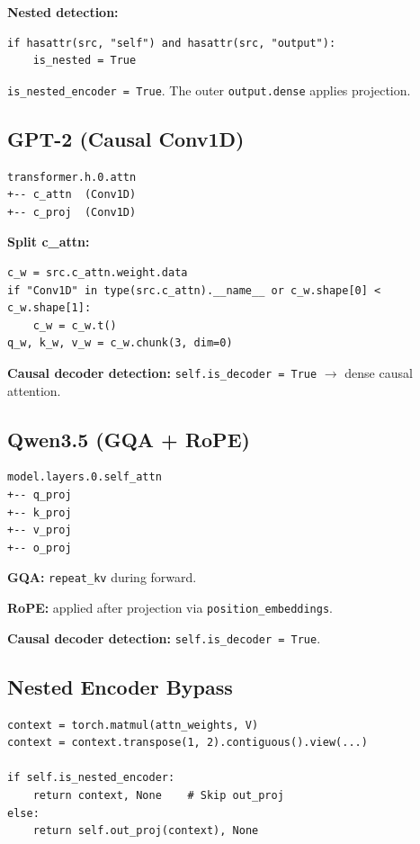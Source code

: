 \textbf{Nested detection:}
\begin{lstlisting}
if hasattr(src, "self") and hasattr(src, "output"):
    is_nested = True
\end{lstlisting}

\texttt{is\_nested\_encoder = True}. The outer \texttt{output.dense} applies projection.

\subsection{GPT-2 (Causal Conv1D)}

\begin{lstlisting}
transformer.h.0.attn
+-- c_attn  (Conv1D)
+-- c_proj  (Conv1D)
\end{lstlisting}

\textbf{Split c\_attn:}
\begin{lstlisting}
c_w = src.c_attn.weight.data
if "Conv1D" in type(src.c_attn).__name__ or c_w.shape[0] < c_w.shape[1]:
    c_w = c_w.t()
q_w, k_w, v_w = c_w.chunk(3, dim=0)
\end{lstlisting}

\textbf{Causal decoder detection:} \texttt{self.is\_decoder = True} $\to$ dense causal 
attention.

\subsection{Qwen3.5 (GQA + RoPE)}

\begin{lstlisting}
model.layers.0.self_attn
+-- q_proj
+-- k_proj
+-- v_proj
+-- o_proj
\end{lstlisting}

\textbf{GQA:} \texttt{repeat\_kv} during forward.

\textbf{RoPE:} applied after projection via \texttt{position\_embeddings}.

\textbf{Causal decoder detection:} \texttt{self.is\_decoder = True}.

\subsection{Nested Encoder Bypass}

\begin{lstlisting}
context = torch.matmul(attn_weights, V)
context = context.transpose(1, 2).contiguous().view(...)

if self.is_nested_encoder:
    return context, None    # Skip out_proj
else:
    return self.out_proj(context), None
\end{lstlisting}

